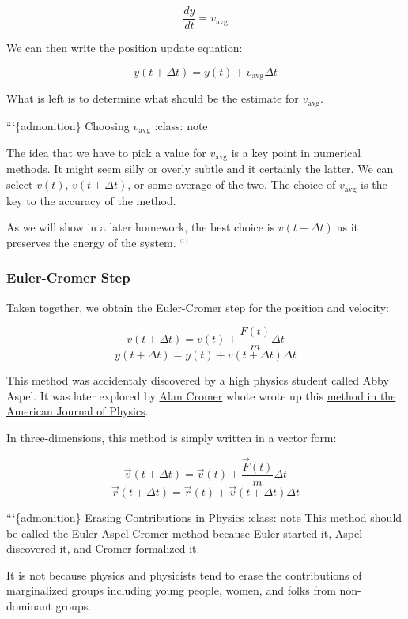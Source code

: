 \documentclass[11pt]{article}
\begin{document}
\[\dfrac{dy}{dt} = v_{\textrm{avg}}\]

We can then write the position update equation:

\[y(t+\Delta t) = y(t) + v_{\textrm{avg}} \Delta t\]

    What is left is to determine what should be the estimate for
\(v_{\textrm{avg}}\).

```\{admonition\} Choosing \(v_{\textrm{avg}}\) :class: note

The idea that we have to pick a value for \(v_{\textrm{avg}}\) is a key
point in numerical methods. It might seem silly or overly subtle and it
certainly the latter. We can select \(v(t)\), \(v(t+\Delta t)\), or some
average of the two. The choice of \(v_{\textrm{avg}}\) is the key to the
accuracy of the method.

As we will show in a later homework, the best choice is
\(v(t+\Delta t)\) as it preserves the energy of the system. ```

    \subsubsection{Euler-Cromer Step}\label{euler-cromer-step}

Taken together, we obtain the
\href{https://en.wikipedia.org/wiki/Semi-implicit_Euler_method}{Euler-Cromer}
step for the position and velocity:

\[v(t+\Delta t) = v(t) + \dfrac{F(t)}{m} \Delta t\]
\[y(t+\Delta t) = y(t) + v(t+\Delta t) \Delta t\]

This method was accidentaly discovered by a high physics student called
Abby Aspel. It was later explored by
\href{https://en.wikipedia.org/wiki/Alan_Cromer}{Alan Cromer} whote
wrote up this
\href{https://aapt.scitation.org/doi/10.1119/1.10903}{method in the
American Journal of Physics}.

In three-dimensions, this method is simply written in a vector form:

\[\vec{v}(t+\Delta t) = \vec{v}(t) + \dfrac{\vec{F}(t)}{m} \Delta t\]
\[\vec{r}(t+\Delta t) = \vec{r}(t) + \vec{v}(t+\Delta t) \Delta t\]

    ```\{admonition\} Erasing Contributions in Physics :class: note This
method should be called the Euler-Aspel-Cromer method because Euler
started it, Aspel discovered it, and Cromer formalized it.

It is not because physics and physicists tend to erase the contributions
of marginalized groups including young people, women, and folks from
non-dominant groups.
\end{document}
